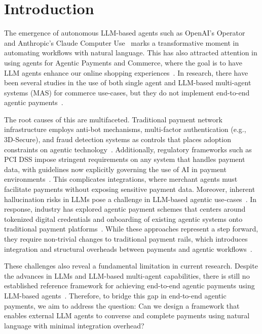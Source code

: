 \documentclass[runningheads]{llncs}
\begin{document}
\section{Introduction}
The emergence of autonomous LLM-based agents such as OpenAI's Operator~\cite{openai2025operator} and Anthropic's Claude Computer Use~\cite{anthropic2025computer} marks a transformative moment in automating workflows with natural language. This has also attracted attention in using agents for Agentic Payments and Commerce, where the goal is to have LLM agents enhance our online shopping experiences~\cite{mckinsey2025agenticpayments}. In research, there have been several studies in the use of both single agent and LLM-based multi-agent systems (MAS) for commerce use-cases, but they do not implement end-to-end agentic payments~\cite{dahiphale2024llmscampayments,guan2024llmprocessautomation,qu-etal-2025-llm-fraud}.

The root causes of this are multifaceted. Traditional payment network infrastructure employs anti-bot mechanisms, multi-factor authentication (e.g., 3D-Secure), and fraud detection systems as controls that places adoption constraints on agentic technology~\cite{mckinsey2025agenticpayments,dwight2025payments}.
Additionally, regulatory frameworks such as PCI DSS impose stringent requirements on any system that handles payment data, with guidelines now explicitly governing the use of AI in payment environments~\cite{pcisecurity2025ai}.
This complicates integrations, where merchant agents must facilitate payments without exposing sensitive payment data.
Moreover, inherent hallucination risks in LLMs pose a challenge in LLM-based agentic use-cases~\cite{guo2024mascollab,huang2025survey,zhang2025sirenhallucination}. 
In response, industry has explored agentic payment schemes that centers around tokenized digital credentials and onboarding of existing agentic systems onto traditional payment platforms~\cite{mastercard2025agentpay,visa2025intelligentcommerce}. While these approaches represent a step forward, they require non-trivial changes to traditional payment rails, which introduces integration and structural overheads between payments and agentic workflows~\cite{mckinsey2025agenticpayments}. 

These challenges also reveal a fundamental limitation in current research. Despite the advances in LLMs and LLM-based multi-agent capabilities, there is still no established reference framework for achieving end-to-end agentic payments using LLM-based agents~\cite{guo2024mascollab,plaat2025agentic,tran2025mascollab}. 
Therefore, to bridge this gap in end-to-end agentic payments, we aim to address the question: Can we design a framework that enables external LLM agents to converse and complete payments using natural language with minimal integration overhead?
\end{document}
